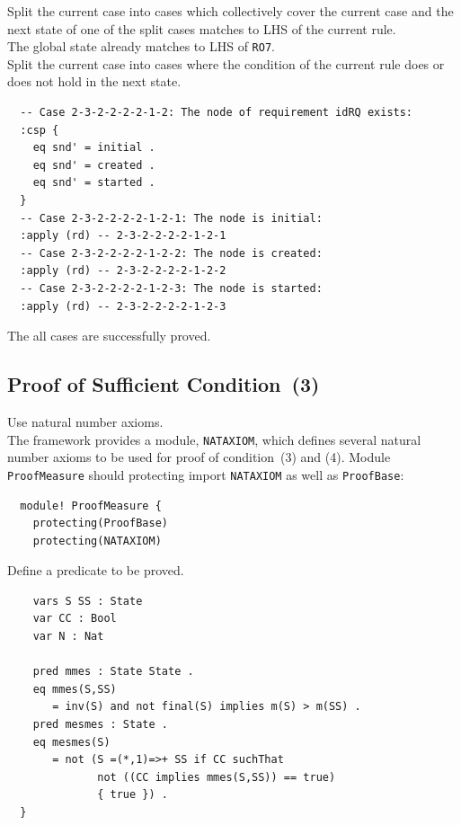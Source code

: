 \documentclass[12pt]{report}
\begin{document}
 Split the current case into cases which
collectively cover the current case and the next state of one of the split cases
matches to LHS of the current rule. \\
The global state already matches to LHS of {\tt RO7}.\\

 Split the current case into cases where the
condition of the current rule does or does not hold in the next state.
\small
\begin{verbatim}
  -- Case 2-3-2-2-2-2-1-2: The node of requirement idRQ exists:
  :csp {
    eq snd' = initial .
    eq snd' = created .
    eq snd' = started .
  }
  -- Case 2-3-2-2-2-2-1-2-1: The node is initial:
  :apply (rd) -- 2-3-2-2-2-2-1-2-1
  -- Case 2-3-2-2-2-2-1-2-2: The node is created:
  :apply (rd) -- 2-3-2-2-2-2-1-2-2
  -- Case 2-3-2-2-2-2-1-2-3: The node is started:
  :apply (rd) -- 2-3-2-2-2-2-1-2-3
\end{verbatim}
\normalsize
The all cases are successfully proved.

\subsection{Proof of Sufficient Condition~(3)}
\label{sec:TOSCAmesmes}
 Use natural number axioms. \\
The framework provides a module, {\tt NATAXIOM}, which defines several
natural number axioms to be used for proof of
condition~(3) and (4).  Module {\tt
  ProofMeasure} should protecting import {\tt NATAXIOM} as well as
{\tt ProofBase}:
\small
\begin{verbatim}
  module! ProofMeasure {
    protecting(ProofBase)
    protecting(NATAXIOM)
\end{verbatim}
\normalsize

 Define a predicate to be proved.
\small
\begin{verbatim}
    vars S SS : State
    var CC : Bool
    var N : Nat
      
    pred mmes : State State .
    eq mmes(S,SS)
       = inv(S) and not final(S) implies m(S) > m(SS) .
    pred mesmes : State .
    eq mesmes(S)
       = not (S =(*,1)=>+ SS if CC suchThat
              not ((CC implies mmes(S,SS)) == true)
              { true }) .
  }
\end{verbatim}
\normalsize
\end{document}
